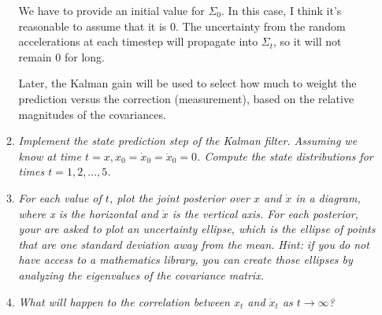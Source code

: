 \documentclass[10pt]{article}
\begin{document}
\begin{enumerate}
\begin{enumerate}
  We have to provide an initial value for $\Sigma_0$. In this case, I think it's
  reasonable to assume that it is $0$. The uncertainty from the random
  accelerations at each timestep will propagate into $\Sigma_t$, so it will not
  remain $0$ for long.

  Later, the Kalman gain will be used to select how much to weight the
  prediction versus the correction (measurement), based on the relative
  magnitudes of the covariances.

\item \textit{Implement the state prediction step of the Kalman filter. Assuming
    we know at time $t=x, x_0 = \dot{x}_0 = \ddot{x}_0 = 0$. Compute the state
  distributions for times $t=1,2,...,5$.}

\item \textit{For each value of $t$, plot the joint posterior over $x$ and
    $\dot{x}$ in a diagram, where x is the horizontal and $\dot{x}$ is the
    vertical axis. For each posterior, your are asked to plot an uncertainty
    ellipse, which is the ellipse of points that are one standard deviation away from
    the mean. Hint: if you do not have access to a mathematics library, you can
  create those ellipses by analyzing the eigenvalues of the covariance matrix.}

\item \textit{What will happen to the correlation between $x_t$ and $\dot{x}_t$
  as $t\to \infty$?}
  \end{enumerate}

\end{enumerate}
\end{document}
